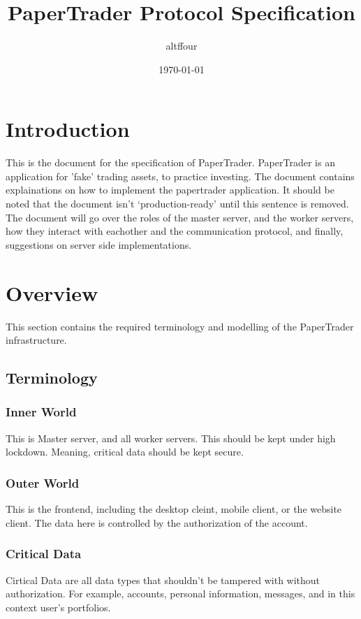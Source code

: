 \documentclass[a4paper]{article}
\title{PaperTrader Protocol Specification}
\author{altffour}
\date{\today}
\begin{document}
\maketitle
\tableofcontents
\newpage

\section{Introduction}
This is the document for the specification of PaperTrader. PaperTrader is an
application for 'fake' trading assets, to practice investing. The document
contains explainations on how to implement the papertrader application. It 
should be noted that the document isn't `production-ready' until this sentence 
is removed. The document will go over the roles of the master server, and the
worker servers, how they interact with eachother and the communication 
protocol, and finally, suggestions on server side implementations.

\section{Overview}
This section contains the required terminology and modelling of the PaperTrader
infrastructure.

\subsection{Terminology}

\subsubsection{Inner World}
This is Master server, and all worker servers. This should be kept under high
lockdown. Meaning, critical data should be kept secure.

\subsubsection{Outer World}
This is the frontend, including the desktop cleint, mobile client, or the
website client. The data here is controlled by the authorization of the 
account.

\subsubsection{Critical Data}
Cirtical Data are all data types that shouldn't be tampered with without
authorization. For example, accounts, personal information, messages, and in
this context user's portfolios.
\end{document}
